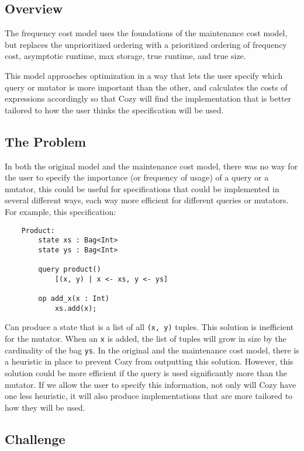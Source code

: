\newcommand{\code}[1]{\texttt{#1}}

\subsection{Overview}
The frequency cost model uses the foundations of the maintenance cost model, but
replaces the unprioritized ordering with a prioritized ordering of frequency
cost, asymptotic runtime, max storage, true runtime, and true size.

This model approaches optimization in a way that lets the user specify which
query or mutator is more important than the other, and calculates the costs of
expressions accordingly so that Cozy will find the implementation that is better
tailored to how the user thinks the specification will be used.

\subsection{The Problem}
In both the original model and the maintenance cost model, there was no way for
the user to specify the importance (or frequency of usage) of a query or a
mutator, this could be useful for specifications that could be implemented in
several different ways, each way more efficient for different queries or
mutators. For example, this specification:

\begin{lstlisting}
    Product:
        state xs : Bag<Int>
        state ys : Bag<Int>

        query product()
            [(x, y) | x <- xs, y <- ys]

        op add_x(x : Int)
            xs.add(x);
\end{lstlisting}

Can produce a state that is a list of all \code{(x, y)} tuples. This solution is
inefficient for the mutator. When an \code{x} is added, the list of tuples will
grow in size by the cardinality of the bag \code{ys}. In the original and the
maintenance cost model, there is a heuristic in place to prevent Cozy from
outputting this solution. However, this solution could be more efficient if the
query is used significantly more than the mutator. If we allow the user to
specify this information, not only will Cozy have one less heuristic, it will
also produce implementations that are more tailored to how they will be used.

\subsection{Challenge}
